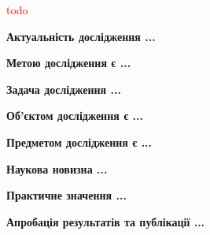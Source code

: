 \textcolor{red}{todo}

\textbf{Актуальність дослідження ...}

\textbf{Метою дослідження є ...}

\textbf{Задача дослідження ...}

\textbf{Об'єктом дослідження є ...}

\textbf{Предметом дослідження є ...}

\textbf{Наукова новизна ...}

\textbf{Практичне значення ...}

\textbf{Апробація результатів та публікації ...}

